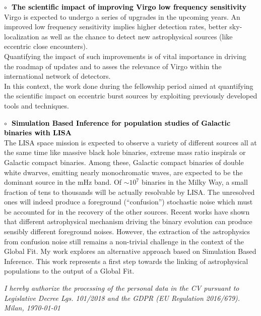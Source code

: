 \medskip

\textbf{\textcolor{black}{\hspace{0.4cm}$\circ\;$ The scientific impact of improving Virgo low frequency sensitivity}}\vspace{0.05cm}\\
\indent Virgo is expected to undergo a series of upgrades in the upcoming years. An improved low
frequency sensitivity implies higher detection rates, better sky-localization as well as the
chance to detect new astrophysical sources (like eccentric close encounters).\\
Quantifying the impact of such improvements is of vital importance in driving the roadmap of
updates and to asses the relevance of Virgo within the international network of detectors.\\
In this context, the work done during the fellowship period aimed at quantifying 
the scientific impact on eccentric burst sources by exploiting previously
developed tools and techniques.

\medskip

\textbf{\textcolor{black}{\hspace{0.4cm}$\circ\;$ Simulation Based Inference for population studies of Galactic binaries with LISA}}\vspace{0.05cm}\\
\indent The LISA space mission is expected to observe 
a variety of different sources all at the same time like massive black hole binaries, extreme mass ratio inspirals or 
Galactic compact binaries. Among these, Galactic compact binaries of double white dwarves, emitting nearly monochromatic waves, 
are expected to be the dominant source 
in the mHz band. Of $\sim10^7$ binaries in the Milky Way, a small fraction of tens to thousands will be actually resolvable by LISA. 
The unresolved ones will indeed produce a foreground (“confusion”) stochastic noise which must be accounted for in the recovery
of the other sources.
Recent works have shown that different astrophysical mechanism driving the binary evolution can produce sensibly different foreground noises. 
However, the extraction of the astrophysics from confusion noise still remains a non-trivial challenge in the context of the Global Fit.
My work explores an alternative approach based on Simulation Based Inference. This work represents a first step towards 
the linking of astrophysical populations to the output of a Global Fit.

\bigskip

\vfill
\textit{\small I hereby authorize the processing of the personal data in the CV pursuant to Legislative Decree Lgs. 101/2018 and the GDPR (EU Regulation 2016/679).}
\\[1em]
\textit{\small Milan, \today}
\\[0.5em]



